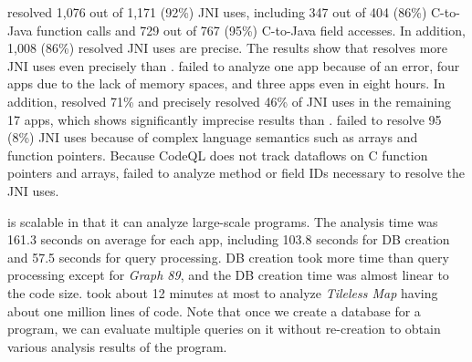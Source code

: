 \ours resolved 1,076 out of 1,171 (92\%) JNI uses, including 347 out of 404
(86\%) C-to-Java function calls and 729 out of 767 (95\%) C-to-Java field
accesses. In addition, 1,008 (86\%) resolved JNI uses are precise.
The results show that \ours resolves more JNI uses
even precisely than \lees. \lees failed to analyze one app
because of an error, four apps due to the lack of memory spaces,
and three apps even in eight hours.  In addition, \lees resolved
71\% and precisely resolved 46\% of JNI uses in the remaining 17
apps, which shows significantly imprecise results than \ours.
%
\ours failed to resolve 95 (8\%) JNI uses because of complex
language semantics such as arrays and function pointers.  Because CodeQL does
not track dataflows on C function pointers and arrays, \ours failed to analyze
method or field IDs necessary to resolve the JNI uses.



\ours is scalable in that it can analyze large-scale programs. The analysis
time was 161.3 seconds on average for each app, including 103.8 seconds for DB
creation and 57.5 seconds for query processing.  DB creation took more time
than query processing except for {\it Graph 89}, and the DB creation time was
almost linear to the code size. \ours took about 12 minutes at most to analyze
{\it Tileless Map} having about one million lines of code.
Note that once we create a database
for a program, we can evaluate multiple queries on it without
re-creation to obtain various analysis results of the program.


